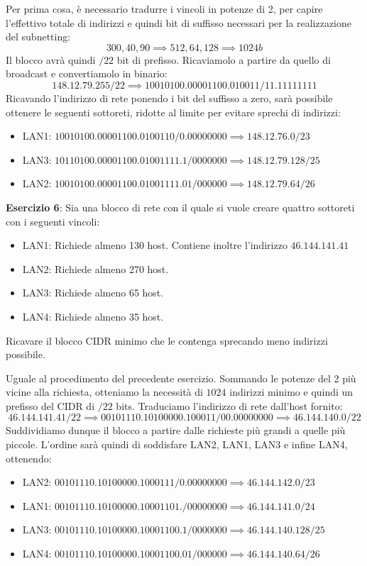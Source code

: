 \noindent Per prima cosa, è necessario tradurre i vincoli in potenze di 2, per capire l'effettivo totale di indirizzi e quindi bit di suffisso
necessari per la realizzazione del subnetting: \[
	300, 40, 90 \implies 512, 64, 128 \implies 1024b
\]
\noindent Il blocco avrà quindi $/22$ bit di prefisso. Ricaviamolo a partire da quello di broadcast e convertiamolo in binario: \[
	148.12.79.255/22 \implies 10010100.00001100.010011/11.11111111
\]
\noindent Ricavando l'indirizzo di rete ponendo i bit del suffisso a zero, sarà possibile ottenere le seguenti sottoreti, ridotte al limite per evitare
sprechi di indirizzi: \begin{itemize}
	\item LAN1: $10010100.00001100.0100110/0.00000000 \implies 148.12.76.0/23$ \checkmark
	\item LAN3: $10110100.00001100.01001111.1/0000000 \implies 148.12.79.128/25$ \checkmark
	\item LAN2: $10010100.00001100.01001111.01/000000 \implies 148.12.79.64/26$ \checkmark
\end{itemize}

\noindent \textbf{Esercizio 6}: Sia una blocco di rete con il quale si vuole creare quattro sottoreti con i seguenti vincoli: \begin{itemize}
	\item LAN1: Richiede almeno 130 host. Contiene inoltre l'indirizzo $46.144.141.41$
	\item LAN2: Richiede almeno 270 host.
	\item LAN3: Richiede almeno 65 host.
	\item LAN4: Richiede almeno 35 host.
\end{itemize}
\noindent Ricavare il blocco CIDR minimo che le contenga sprecando meno indirizzi possibile.\newline

\noindent Uguale al procedimento del precedente esercizio. Sommando le potenze del 2 più vicine alla richiesta, otteniamo la necessità di $1024$
indirizzi minimo e quindi un prefisso del CIDR di $/22$ bits. Traduciamo l'indirizzo di rete dall'host fornito: \[
	46.144.141.41/22 \implies 00101110.10100000.100011/00.00000000 \implies 46.144.140.0/22
\]
\noindent Suddividiamo dunque il blocco a partire dalle richieste più grandi a quelle più piccole. L'ordine sarà quindi di soddisfare LAN2, LAN1, LAN3 e
infine LAN4, ottenendo: \begin{itemize}
	\item LAN2: $00101110.10100000.1000111/0.00000000 \implies 46.144.142.0/23$ \checkmark 
	\item LAN1: $00101110.10100000.10001101./00000000 \implies 46.144.141.0/24$ \checkmark
	\item LAN3: $00101110.10100000.10001100.1/0000000 \implies 46.144.140.128/25$ \checkmark
	\item LAN4: $00101110.10100000.10001100.01/000000 \implies 46.144.140.64/26$ \checkmark
\end{itemize}

